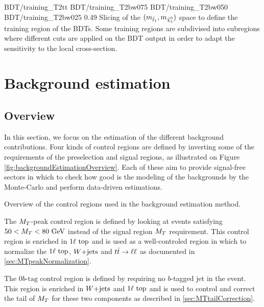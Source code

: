                               {BDT/training_T2tt}
                              {BDT/training_T2bw075}
                              {BDT/training_T2bw050}
                              {BDT/training_T2bw025}
                              {0.49}
                              {Slicing of the $(m_{\tilde{t}_1},m_{\tilde{\chi}_1^0})$ space to define the training region of the BDTs. Some training regions are subdivised into subregions where different cuts are applied on the BDT output in order to adapt the sensitivity to the local cross-section.}

    \section{Background estimation \label{sec:analysis_backgroundEstimation}}

        \subsection{Overview} 

        In this section, we focus on the estimation of the different background contributions. 
        Four kinds of control regions are defined by inverting some of the requirements of the
        preselection and signal regions, as illustrated on Figure \ref{fig:backgroundEstimationOverview}.
        Each of these aim to provide signal-free sectors in which to check how good is the modeling
        of the backgrounds by the Monte-Carlo and perform data-driven estimations.

                         {Overview of the control regions used in the background estimation method.}

        The $M_T$-peak control region is defined by looking at events satisfying $50 < M_T < 80 ~\text{GeV}$
        instead of the signal region $M_T$ requirement. This control region is enriched in $1\ell~\text{top}$
        and is used as a well-controled region in which to normalize the $1\ell~\text{top}$, $\text{$W$+jets}$ 
        and $t\bar{t} \rightarrow \ell \ell$ as documented in \ref{sec:MTpeakNormalization}.
        
        The $0b\text{-tag}$ control region is defined by requiring no $b$-tagged jet in the event.
        This region is enriched in $\text{$W$+jets}$ and $1\ell~\text{top}$ and is used to control and correct 
        the tail of $M_T$ for these two components as described in \ref{sec:MTtailCorrection}.

